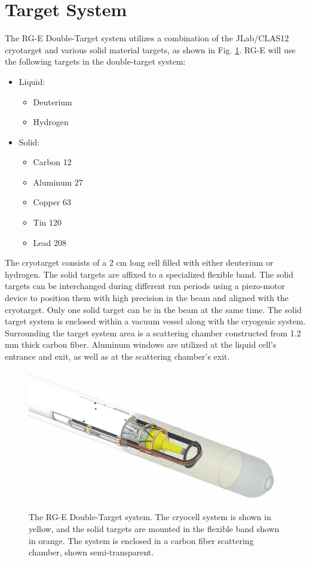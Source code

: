 \section{Target System}
The RG-E Double-Target system utilizes a combination of the JLab/CLAS12
cryotarget and various solid material targets, as shown in Fig. \ref{fig:rge-target}. RG-E will use the following targets in the double-target system:
\begin{itemize}
    \item Liquid:
    \begin{itemize}
        \item Deuterium
        \item Hydrogen
    \end{itemize}
    \item Solid:
    \begin{itemize}
        \item Carbon 12
        \item Aluminum 27
        \item Copper 63
        \item Tin 120
        \item Lead 208
    \end{itemize}
\end{itemize}

  The cryotarget consists of a 2 cm long cell filled with either deuterium or hydrogen. The solid targets are affixed to a specialized flexible band. The solid targets can be interchanged during different run periods using a piezo-motor device to position them with high precision in the beam and aligned with the cryotarget. Only one solid target can be in the beam at the same time.
  The solid target system is enclosed within a vacuum vessel along with the cryogenic system. Surrounding the target system area is a scattering chamber constructed from 1.2 mm thick carbon fiber. Aluminum windows are utilized at the liquid cell's entrance and exit, as well as at the scattering chamber's exit.
  \begin{figure}
      \centering
      \includegraphics[width=0.9\columnwidth]{pics/rge-target.png}
      \caption{The RG-E Double-Target system. The cryocell system is shown in yellow, and the solid targets are mounted in the flexible band shown in orange. The system is enclosed in a carbon fiber scattering chamber, shown semi-transparent.}
      \label{fig:rge-target}
  \end{figure}

